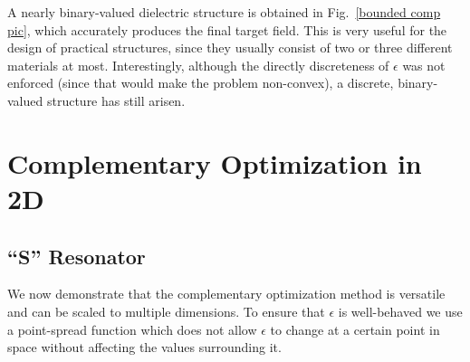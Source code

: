 A nearly binary-valued dielectric structure is obtained in Fig.~\ref{bounded comp pic}, which accurately produces the final target field. This is very useful for the design of practical structures, since they usually consist of two or three different materials at most. Interestingly, although the directly discreteness of $\epsilon$ was not enforced (since that would make the problem non-convex), a discrete, binary-valued structure has still arisen. 

\section{Complementary Optimization in 2D}
\subsection{``S'' Resonator}
We now demonstrate that the complementary optimization method is versatile and can be scaled to multiple dimensions. To ensure that $\epsilon$ is well-behaved we use a point-spread function which does not allow $\epsilon$ to change at a certain point in space without affecting the values surrounding it. 

